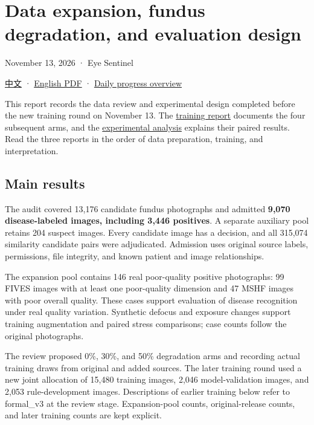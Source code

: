 \documentclass[
  10pt,
]{article}
\author{}
\date{}
\begin{document}
\section{Data expansion, fundus degradation, and evaluation
design}\label{data-expansion-fundus-degradation-and-evaluation-design}

November 13, 2026 · Eye Sentinel

\href{data-and-degradation-review.zh.md}{中文} ·
\href{data-and-degradation-review.en.pdf}{English PDF} ·
\href{../progress-overview.en.md}{Daily progress overview}

This report records the data review and experimental design completed
before the new training round on November 13. The
\href{../training-results/training-results.en.md}{training report}
documents the four subsequent arms, and the
\href{../experimental-analysis/experimental-analysis.en.md}{experimental
analysis} explains their paired results. Read the three reports in the
order of data preparation, training, and interpretation.

\subsection{Main results}\label{main-results}

The audit covered 13,176 candidate fundus photographs and admitted
\textbf{9,070 disease-labeled images, including 3,446 positives}. A
separate auxiliary pool retains 204 suspect images. Every candidate
image has a decision, and all 315,074 similarity candidate pairs were
adjudicated. Admission uses original source labels, permissions, file
integrity, and known patient and image relationships.

The expansion pool contains 146 real poor-quality positive photographs:
99 FIVES images with at least one poor-quality dimension and 47 MSHF
images with poor overall quality. These cases support evaluation of
disease recognition under real quality variation. Synthetic defocus and
exposure changes support training augmentation and paired stress
comparisons; case counts follow the original photographs.

The review proposed 0\%, 30\%, and 50\% degradation arms and recording
actual training draws from original and added sources. The later
training round used a new joint allocation of 15,480 training images,
2,046 model-validation images, and 2,053 rule-development images.
Descriptions of earlier training below refer to formal\_v3 at the review
stage. Expansion-pool counts, original-release counts, and later
training counts are kept explicit.
\end{document}
